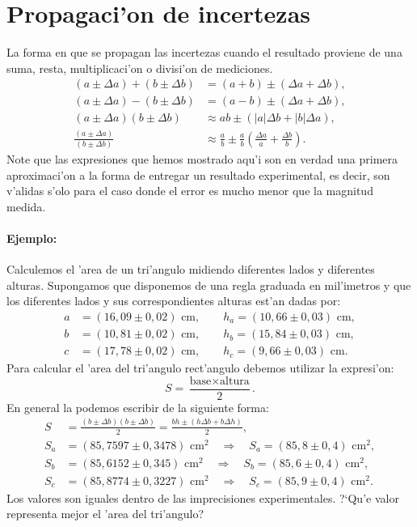 \documentclass[a4paper]{report}
\begin{document}
\section{Propagaci'on de incertezas}
La forma en que se propagan las incertezas cuando el resultado proviene de una suma, resta, multiplicaci'on o divisi'on de mediciones.
\begin{align}
(a\pm\Delta a)+(b\pm\Delta b) &= (a+b)\pm(\Delta a+\Delta b), \\
(a\pm\Delta a)-(b\pm\Delta b) &= (a-b)\pm(\Delta a+\Delta b), \\
(a\pm\Delta a)(b\pm\Delta b) &\approx  ab\pm(|a|\Delta b+|b|\Delta a), \\
\frac{(a\pm\Delta a)}{(b\pm\Delta b)} &\approx \frac{a}{b}\pm \frac{a}{b}\left(\frac{\Delta a}{a}+\frac{\Delta b}{b}\right).
\end{align}
Note que las expresiones que hemos mostrado aqu'i son en verdad una primera aproximaci'on a la forma de entregar un resultado experimental, es decir, son v'alidas s'olo para el caso donde el error es mucho menor que la magnitud medida.

\paragraph{Ejemplo:}
Calculemos el 'area de un tri'angulo midiendo diferentes lados y diferentes alturas. Supongamos que disponemos de una regla graduada en mil'imetros y que los diferentes lados y sus correspondientes alturas est'an dadas por: 
\begin{align}
a &= (16,09\pm 0,02)\text{ cm}, \qquad h_a= (10,66\pm 0,03)\text{ cm}, \\
b &= (10,81\pm 0,02)\text{ cm}, \qquad h_b= (15,84\pm 0,03)\text{ cm}, \\
c &= (17,78\pm 0,02)\text{ cm}, \qquad h_c= (9,66\pm 0,03)\text{ cm}.
\end{align}
Para calcular el 'area del tri'angulo rect'angulo debemos utilizar la expresi'on:
\begin{equation}
S=\frac{\text{base}\times\text{altura}}{2}.
\end{equation}
En general la podemos escribir de la siguiente forma:
\begin{align}
S &= \frac{(b\pm\Delta b)(b\pm\Delta b)}{2}=\frac{bh\pm (h\Delta b+b\Delta h)}{2}, \\
S_a &= (85,7597\pm 0,3478)\text{ cm}^2 \quad \Rightarrow\quad S_a= (85,8\pm 0,4)\text{ cm}^2, \\
S_b &= (85,6152\pm 0,345)\text{ cm}^2 \quad \Rightarrow\quad S_b= (85,6\pm 0,4)\text{ cm}^2, \\
S_c &= (85,8774\pm 0,3227)\text{ cm}^2 \quad \Rightarrow\quad S_c= (85,9\pm 0,4)\text{ cm}^2.
\end{align}
Los valores son iguales dentro de las imprecisiones experimentales.
?`Qu'e valor representa mejor el 'area del tri'angulo?
\end{document}
